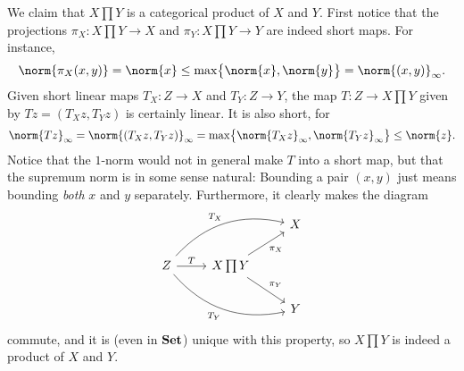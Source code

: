 \documentclass[article, a4paper, 11pt, oneside]{memoir}
\numberwithin{equation}{chapter}
\theoremstyle{nonumberplain}
\begin{document}
\begin{remarkbreak}
	We claim that $X \prod Y$ is a categorical product of $X$ and $Y$. First notice that the projections $\pi_X \colon X \prod Y \to X$ and $\pi_Y \colon X \prod Y \to Y$ are indeed short maps. For instance,
	\begin{equation*}
		\norm{\pi_X(x,y)}
			= \norm{x}
			\leq \max \bigl\{ \norm{x}, \norm{y} \bigr\}
			= \norm{(x,y)}_\infty.
	\end{equation*}
	Given short linear maps $T_X \colon Z \to X$ and $T_Y \colon Z \to Y$, the map $T \colon Z \to X \prod Y$ given by $Tz = (T_X z, T_Y z)$ is certainly linear. It is also short, for
	\begin{equation*}
		\norm{Tz}_\infty
			= \norm{(T_X z, T_Y z)}_\infty
			= \max \bigl\{ \norm{T_X z}_\infty, \norm{T_Y z}_\infty \bigr\}
			\leq \norm{z}.
	\end{equation*}
	Notice that the $1$-norm would not in general make $T$ into a short map, but that the supremum norm is in some sense natural: Bounding a pair $(x,y)$ just means bounding \emph{both} $x$ and $y$ separately. Furthermore, it clearly makes the diagram
	\begin{equation*}
        \begin{tikzcd}
            && X \\
            Z
                \ar[r, "T"]
                \ar[urr, "T_X", bend left]
                \ar[drr, "T_Y", bend right, swap]
            & X \prod Y
                \ar[ur, "\pi_X", swap]
                \ar[dr, "\pi_Y"] \\
            && Y
        \end{tikzcd}
    \end{equation*}
	commute, and it is (even in $\mathbf{Set}$) unique with this property, so $X \prod Y$ is indeed a product of $X$ and $Y$.


\end{remarkbreak}
\end{document}
